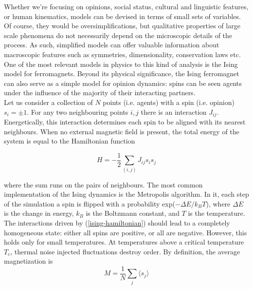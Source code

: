 \documentclass[12pt,openright,twoside]{book}
\begin{document}
Whether we're focusing on opinions, social status, cultural and linguistic features, or human kinematics, models can be devised in terms of small sets of variables. Of course, they would be oversimplifications, but qualitative properties of large scale phenomena do not necessarily depend on the microscopic details of the process. As such, simplified models can offer valuable information about macroscopic features such as symmetries, dimensionality, conservation laws etc. One of the most relevant models in physics to this kind of analysis is the Ising model for ferromagnets\cite{binney_2002}. Beyond its physical significance, the Ising ferromagnet can also serve as a simple model for opinion dynamics: spins can be seen agents under the influence of the majority of their interacting partners.\\

Let us consider a collection of $N$ points (i.e. agents) with a spin (i.e. opinion) $s_i=\pm1$. For any two neighbouring points $i,j$ there is an interaction $J_{ij}$. Energetically, this interaction determines each spin to be aligned with its nearest neighbours. When no external magnetic field is present, the total energy of the system is equal to the Hamiltonian function

\begin{equation}
H=-\frac{1}{2}\sum_{(i,j)}J_{ij}s_is_j
\label{ising-hamiltonian}
\end{equation}

\vspace{14pt}

where the sum runs on the pairs of neighbours. The most common implementation of the Ising dynamics is the Metropolis algorithm\cite{landau_binder_2015}. In it, each step of the simulation a spin is flipped with a probability exp($-\Delta E/k_BT$), where $\Delta E$ is the change in energy, $k_B$ is the Boltzmann constant, and $T$ is the temperature. The interactions driven by (\ref{ising-hamiltonian}) should lead to a completely homogeneous state: either all spins are positive, or all are negative. However, this holds only for small temperatures. At temperatures above a critical temperature $T_c$, thermal noise injected fluctuations destroy order. By definition, the average magnetization is\\

\begin{equation}
M=\frac{1}{N}\sum_j\langle s_j \rangle
\label{ising-magnetization}
\end{equation}
\end{document}
